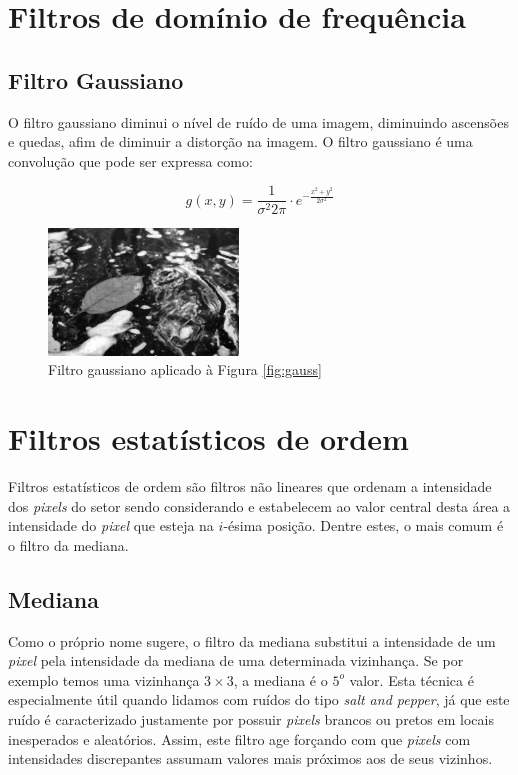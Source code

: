\documentclass[10pt,a4paper]{article}
\newcommand{\pixel}{\textit{pixel} }
\newcommand{\pixels}{\textit{pixels} }
\begin{document}
\newpage

\section{Filtros de domínio de frequência}
\subsection{Filtro Gaussiano}
O filtro gaussiano diminui o nível de ruído de uma imagem, diminuindo ascensões e quedas, afim de diminuir a distorção na imagem. O filtro gaussiano é uma convolução que pode ser expressa como:

\begin{equation}
g(x,y) = \frac{1}{\sigma^{2} 2 \pi} \cdot e^{-\frac{x^2 + y^2}{2 \sigma^{2}}}
\end{equation}

\begin{figure}[!ht]
    \centering
    \includegraphics[width=0.45\textwidth]{dst_sp_median.jpg}
    \caption{Filtro gaussiano aplicado à Figura \ref{fig:gauss}}
    \label{fig:gauss_filter}
\end{figure}

\section{Filtros estatísticos de ordem}
Filtros estatísticos de ordem são filtros não lineares que ordenam a intensidade dos \pixels do setor sendo considerando e estabelecem ao valor central desta área a intensidade do \pixel que esteja na $i$-ésima posição. Dentre estes, o mais comum é o filtro da mediana.

\subsection{Mediana}
Como o próprio nome sugere, o filtro da mediana substitui a intensidade de um \pixel pela intensidade da mediana de uma determinada vizinhança. Se por exemplo temos uma vizinhança $3\times3$, a mediana é o $5^o$ valor. Esta técnica é especialmente útil quando lidamos com ruídos do tipo \textit{salt and pepper}, já que este ruído é caracterizado justamente por possuir \pixels brancos ou pretos em locais inesperados e aleatórios. Assim, este filtro age forçando com que \pixels com intensidades discrepantes assumam valores mais próximos aos de seus vizinhos.
\end{document}

